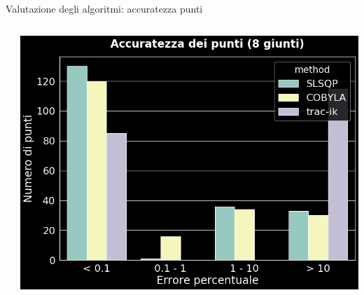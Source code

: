 \begin{frame}{Valutazione degli algoritmi: accuratezza punti}
\begin{columns}
\begin{column}{0.35\textwidth}
\end{column}
\begin{column}{0.7\textwidth}
\includegraphics[width=\textwidth]{slide/img_cinematica_inversa/accuratezza_8.png}
\end{column}
\end{columns}

\end{frame}

